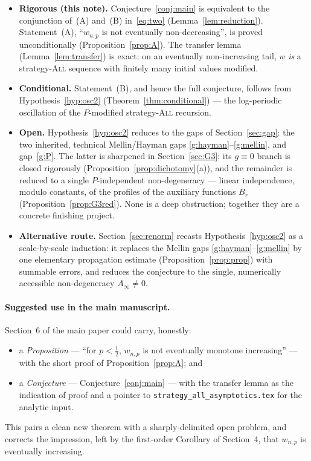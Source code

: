 \documentclass[11pt]{article}
\theoremstyle{definition}
\newcommand{\All}{\textsc{All}}
\begin{document}
\begin{itemize}[leftmargin=1.6em]
\item \textbf{Rigorous (this note).}
  Conjecture~\ref{conj:main} is equivalent to the conjunction of~(A)
  and~(B) in~\eqref{eq:two} (Lemma~\ref{lem:reduction}).
  Statement~(A), ``$w_{n,p}$ is not eventually non-decreasing'', is
  proved unconditionally (Proposition~\ref{prop:A}). The transfer
  lemma (Lemma~\ref{lem:transfer}) is exact: on an eventually
  non-increasing tail, $w$ \emph{is} a strategy-\All{} sequence with
  finitely many initial values modified.
\item \textbf{Conditional.} Statement~(B), and hence the full
  conjecture, follows from Hypothesis~\ref{hyp:osc2}
  (Theorem~\ref{thm:conditional}) --- the log-periodic oscillation of
  the $P$-modified strategy-\All{} recursion.
\item \textbf{Open.} Hypothesis~\ref{hyp:osc2} reduces to the gaps of
  Section~\ref{sec:gap}: the two inherited, technical Mellin/Hayman
  gaps \ref{g:hayman}--\ref{g:mellin}, and gap~\ref{g:P}. The latter
  is sharpened in Section~\ref{sec:G3}: its $g\equiv0$ branch is closed
  rigorously (Proposition~\ref{prop:dichotomy}(a)), and the remainder
  is reduced to a single $P$-independent non-degeneracy --- linear
  independence, modulo constants, of the profiles of the auxiliary
  functions $B_r$ (Proposition~\ref{prop:G3red}). None is a deep
  obstruction; together they are a concrete finishing project.
\item \textbf{Alternative route.} Section~\ref{sec:renorm} recasts
  Hypothesis~\ref{hyp:osc2} as a scale-by-scale induction: it replaces
  the Mellin gaps \ref{g:hayman}--\ref{g:mellin} by one elementary
  propagation estimate (Proposition~\ref{prop:prop}) with summable
  errors, and reduces the conjecture to the single, numerically
  accessible non-degeneracy $A_\infty\ne0$.
\end{itemize}

\paragraph{Suggested use in the main manuscript.} Section~6 of the
main paper could carry, honestly:
\begin{itemize}[leftmargin=1.6em]
\item a \emph{Proposition} --- ``for $p<\tfrac12$, $w_{n,p}$ is not
  eventually monotone increasing'' --- with the short proof of
  Proposition~\ref{prop:A}; and
\item a \emph{Conjecture} --- Conjecture~\ref{conj:main} --- with the
  transfer lemma as the indication of proof and a pointer to
  \texttt{strategy\_all\_asymptotics.tex} for the analytic input.
\end{itemize}
This pairs a clean new theorem with a sharply-delimited open problem,
and corrects the impression, left by the first-order Corollary of
Section~4, that $w_{n,p}$ is eventually increasing.
\end{document}
